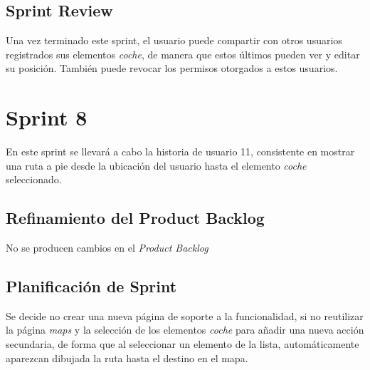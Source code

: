 	\subsection{Sprint Review}
	Una vez terminado este sprint, el usuario puede compartir con otros usuarios registrados sus elementos \textit{coche}, de manera que estos últimos pueden ver y editar su posición. También puede revocar los permisos otorgados a estos usuarios.
	
\section{Sprint 8}
	En este sprint se llevará a cabo la historia de usuario 11, consistente en mostrar una ruta a pie desde la ubicación del usuario hasta el elemento \textit{coche} seleccionado.

	\subsection{Refinamiento del Product Backlog}
	No se producen cambios en el \textit{Product Backlog}

	\subsection{Planificación de Sprint}
	Se decide no crear una nueva página de soporte a la funcionalidad, si no reutilizar la página \textit{maps} y la selección de los elementos \textit{coche} para añadir una nueva acción secundaria, de forma que al seleccionar un elemento de la lista, automáticamente aparezcan dibujada la ruta hasta el destino en el mapa.
	
